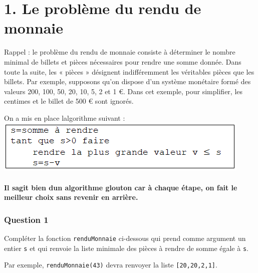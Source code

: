 \documentclass[
  paper=a4,
  ,captions=tableheading
]{scrartcl}
\author{}
\date{}
\title{}
\author{}
\date{}
\begin{document}




\hypertarget{1-le-probluxe8me-du-rendu-de-monnaie}{%
\section{1. Le problème du rendu de
monnaie}\label{1-le-probluxe8me-du-rendu-de-monnaie}}

Rappel : le problème du rendu de monnaie consiste à déterminer le nombre
minimal de billets et pièces nécessaires pour rendre une somme donnée.
Dans toute la suite, les « pièces » désignent indifféremment les
véritables pièces que les billets. Par exemple, supposons qu'on dispose
d'un système monétaire formé des valeurs 200, 100, 50, 20, 10, 5, 2 et 1
€. Dans cet exemple, pour simplifier, les centimes et le billet de 500 €
sont ignorés.

On a mis en place l\textquotesingle algorithme suivant :
\includegraphics{images/1-image.png}

\hypertarget{il-sagit-bien-dun-algorithme-glouton-car-uxe0-chaque-uxe9tape-on-fait-le-meilleur-choix-sans-revenir-en-arriuxe8re}{%
\paragraph{Il s\textquotesingle agit bien d\textquotesingle un
algorithme glouton car à chaque étape, on fait le meilleur choix sans
revenir en
arrière.}\label{il-sagit-bien-dun-algorithme-glouton-car-uxe0-chaque-uxe9tape-on-fait-le-meilleur-choix-sans-revenir-en-arriuxe8re}}

\hypertarget{question-1}{%
\subsubsection{Question 1}\label{question-1}}

Compléter la fonction \texttt{renduMonnaie} ci-dessous qui prend comme
argument un entier \texttt{s} et qui renvoie la liste minimale des
pièces à rendre de somme égale à \texttt{s}.

Par exemple, \texttt{renduMonnaie(43)} devra renvoyer la liste
\texttt{{[}20,20,2,1{]}}.
\end{document}
